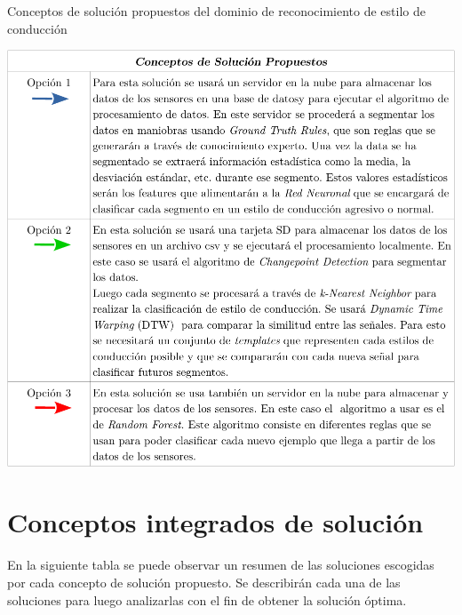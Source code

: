 \begin{table}[htbp!]
  \centering
  \caption{Conceptos de solución propuestos del dominio de reconocimiento de estilo de conducción}
  \label{diag:sol_clas}
  \includegraphics[width=\linewidth]{sol_clas.pdf}
\end{table}

\newpage

\section{Conceptos integrados de solución}
En la siguiente tabla se puede observar un resumen de las soluciones escogidas por cada concepto de solución propuesto. Se describirán cada una de las soluciones para luego analizarlas con el fin de obtener la solución óptima.

